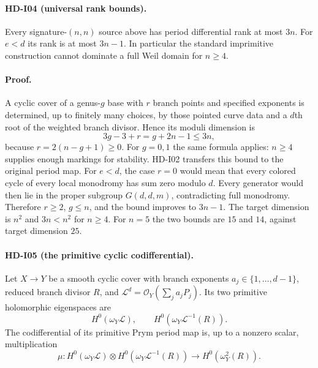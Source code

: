 \paragraph{HD-I04 (universal rank bounds).}
Every signature-$(n,n)$ source above has period differential rank at
most $3n$. For $e<d$ its rank is at most $3n-1$. In particular the
standard imprimitive construction cannot dominate a full Weil domain
for $n\ge4$.

\paragraph{Proof.}
A cyclic cover of a genus-$g$ base with $r$ branch points and specified
exponents is determined, up to finitely many choices, by those pointed
curve data and a $d$th root of the weighted branch divisor. Hence its
moduli dimension is
\[
3g-3+r=g+2n-1\le3n,
\]
because $r=2(n-g+1)\ge0$. For $g=0,1$ the same formula applies:
$n\ge4$ supplies enough markings for stability. HD-I02 transfers this
bound to the original period map.
For $e<d$, the case $r=0$ would mean that every colored cycle of every
local monodromy has sum zero modulo $d$. Every generator would then
lie in the proper subgroup $G(d,d,m)$, contradicting full monodromy.
Therefore $r\ge2$, $g\le n$, and the bound improves to $3n-1$.
The target dimension is $n^2$ and $3n<n^2$ for $n\ge4$. For $n=5$
the two bounds are $15$ and $14$, against target dimension $25$.

\paragraph{HD-I05 (the primitive cyclic codifferential).}
Let $X\to Y$ be a smooth cyclic cover with branch exponents
$a_j\in\{1,\ldots,d-1\}$, reduced branch divisor $R$, and
$\mathcal L^d=\mathcal O_Y(\sum_j a_jP_j)$. Its two primitive
holomorphic eigenspaces are
\[
H^0(\omega_Y\mathcal L),\qquad
H^0(\omega_Y\mathcal L^{-1}(R)).
\]
The codifferential of its primitive Prym period map is, up to a
nonzero scalar, multiplication
\[
\mu:H^0(\omega_Y\mathcal L)\otimes
H^0(\omega_Y\mathcal L^{-1}(R))
\longrightarrow H^0(\omega_Y^2(R)).
\]


